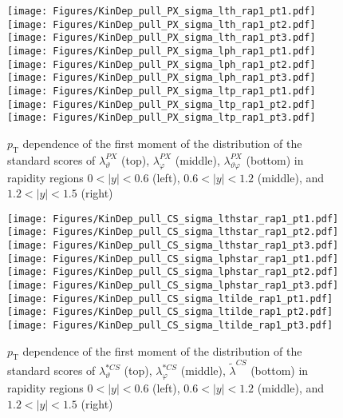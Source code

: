 \documentclass[12pt]{article}
\newcommand{\pT}{p_\mathrm{T}}
\newcommand{\absy}{\left |  y \right |}
\newcommand{\lamtildeCS}{\tilde{\lambda}^{\scriptscriptstyle CS}}
\newcommand{\lamthstarCS}{\lambda^{* \scriptscriptstyle CS}_\vartheta}
\newcommand{\lamphstarCS}{\lambda^{* \scriptscriptstyle CS}_\varphi}
\newcommand{\lamthPX}{\lambda^{\scriptscriptstyle PX}_\vartheta}
\newcommand{\lamphPX}{\lambda^{\scriptscriptstyle PX}_\varphi}
\newcommand{\lamthphPX}{\lambda^{\scriptscriptstyle PX}_{\vartheta \varphi}}
\begin{document}
\begin{figure}[htbp]
\centering
\texttt{[image: Figures/KinDep\_pull\_PX\_sigma\_lth\_rap1\_pt1.pdf]}
\texttt{[image: Figures/KinDep\_pull\_PX\_sigma\_lth\_rap1\_pt2.pdf]}
\texttt{[image: Figures/KinDep\_pull\_PX\_sigma\_lth\_rap1\_pt3.pdf]}
\texttt{[image: Figures/KinDep\_pull\_PX\_sigma\_lph\_rap1\_pt1.pdf]}
\texttt{[image: Figures/KinDep\_pull\_PX\_sigma\_lph\_rap1\_pt2.pdf]}
\texttt{[image: Figures/KinDep\_pull\_PX\_sigma\_lph\_rap1\_pt3.pdf]}
\texttt{[image: Figures/KinDep\_pull\_PX\_sigma\_ltp\_rap1\_pt1.pdf]}
\texttt{[image: Figures/KinDep\_pull\_PX\_sigma\_ltp\_rap1\_pt2.pdf]}
\texttt{[image: Figures/KinDep\_pull\_PX\_sigma\_ltp\_rap1\_pt3.pdf]}
\caption{$\pT$ dependence of the first moment of the distribution of the
standard scores of $\lamthPX$ (top), $\lamphPX$ (middle), $\lamthphPX$ (bottom) in rapidity
regions $0<\absy<0.6$ (left), $0.6<\absy<1.2$ (middle), and $1.2<\absy<1.5$ (right)}
\end{figure}
\clearpage

\begin{figure}[htbp]
\centering
\texttt{[image: Figures/KinDep\_pull\_CS\_sigma\_lthstar\_rap1\_pt1.pdf]}
\texttt{[image: Figures/KinDep\_pull\_CS\_sigma\_lthstar\_rap1\_pt2.pdf]}
\texttt{[image: Figures/KinDep\_pull\_CS\_sigma\_lthstar\_rap1\_pt3.pdf]}
\texttt{[image: Figures/KinDep\_pull\_CS\_sigma\_lphstar\_rap1\_pt1.pdf]}
\texttt{[image: Figures/KinDep\_pull\_CS\_sigma\_lphstar\_rap1\_pt2.pdf]}
\texttt{[image: Figures/KinDep\_pull\_CS\_sigma\_lphstar\_rap1\_pt3.pdf]}
\texttt{[image: Figures/KinDep\_pull\_CS\_sigma\_ltilde\_rap1\_pt1.pdf]}
\texttt{[image: Figures/KinDep\_pull\_CS\_sigma\_ltilde\_rap1\_pt2.pdf]}
\texttt{[image: Figures/KinDep\_pull\_CS\_sigma\_ltilde\_rap1\_pt3.pdf]}
\caption{$\pT$ dependence of the first moment of the distribution of the
standard scores of $\lamthstarCS$ (top), $\lamphstarCS$ (middle), $\lamtildeCS$ (bottom) in rapidity
regions $0<\absy<0.6$ (left), $0.6<\absy<1.2$ (middle), and $1.2<\absy<1.5$ (right)}
\end{figure}
\clearpage
\end{document}

